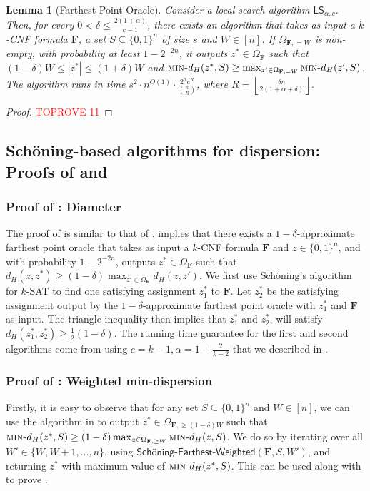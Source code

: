 \documentclass[11pt, letterpaper]{article}
\newtheorem{lemma}[theorem]{Lemma}
\theoremstyle{definition}
\newcommand{\Q}[1]{\{0,1\}^{#1}}
\newcommand{\f}{\mathbf{F}}
\newcommand{\Om}{\Omega_{\f}}
\newcommand{\LS}{\textsf{LS}}
\newcommand{\mind}{\textsc{min-}d_H}
\newcommand{\sch}{Sch\"{o}ning\xspace}
\newcommand{\floor}[1]{{\left\lfloor{#1}\right\rfloor}}
\begin{document}
 \begin{lemma} [Farthest Point Oracle]
 \label{lem:schFarthestHeavy}
    Consider a local search algorithm $\LS_{\alpha, c}$. Then, for every $0 < \delta \leq \frac{2(1+\alpha)}{c-1}$, there exists an algorithm that takes as input a $k$-CNF formula $\f$, a set $S \subseteq \{0,1\}^n$ of size $s$ and $W \in [n]$. If $\Omega_{\f, =W}$ is non-empty, with probability at least $1-2^{-2n}$, it outputs $z^* \in \Om$ such that $(1-\delta) W\leq |z^*| \leq (1+\delta) W$ and $\mind(z^*,S) \geq \max_{z' \in \Omega_{\f, =W}} \mind(z',S)$. The algorithm runs in time $s^2 \cdot n^{O(1)} \cdot \frac{2^n c^{R}}{\binom{n}{R} }$, where $R=\floor{\frac{\delta n}{2(1+\alpha+\delta)}}$.
 \end{lemma}
 \begin{proof}\textcolor{red}{TOPROVE 11}\end{proof}


\subsection{\sch-based algorithms for dispersion: Proofs of  and } \label{sec:schfinal}
\subsubsection*{Proof of : Diameter}
The proof of  is similar to that of .  implies  that there exists a $1-\delta$-approximate farthest point oracle that takes as input a $k$-CNF formula $\f$ and $z \in \Q{n}$, and with probability $1-2^{-2n}$, outputs $z^* \in \Om$ such that $d_H(z,z^*) \geq (1-\delta) \max_{z' \in \Om} d_H(z,z')$. We first use \sch's algorithm for $k$-SAT to find one satisfying assignment $z_1^*$ to $\f$. Let $z_2^*$ be the satisfying assignment output by the $1-\delta$-approximate farthest point oracle with $z^*_1$ and $\f$ as input. The triangle inequality then implies that $z_1^*$ and $z_2^*$, will satisfy $d_H(z_1^*, z_2^*) \geq \frac{1}{2} (1-\delta)$. The running time guarantee for the first and second algorithms come from using $c=k-1, \alpha=1+\frac{2}{k-2}$ that we described in . 

\subsubsection*{Proof of : Weighted min-dispersion}
Firstly, it is easy to observe that for any set $S \subseteq \Q{n}$ and $W \in [n]$, we can use the algorithm in  to output $z^* \in \Omega_{\f, \geq (1-\delta )W}$ such that $\mind( z^*, S) \geq (1-\delta) \max_{z \in \Omega_{\f, \geq W}} \mind(z, S)$. We do so by iterating over all $W' \in \{W, W+1, \dots, n\}$, using $\textsf{\sch-Farthest-Weighted}(\f, S, W')$, and returning $z^*$ with maximum value of $\mind(z^*, S)$. This can be used along with  to prove .
\end{document}
